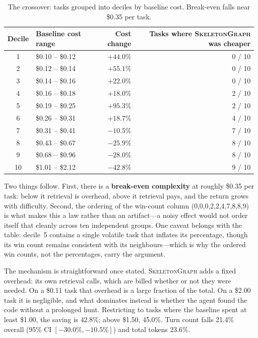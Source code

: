 \documentclass[11pt,letterpaper]{article}
\newcommand{\sg}{\textsc{SkeletonGraph}}
\begin{document}
\begin{table}[t]
\centering
\begin{tabular}{clrr}
\toprule
Decile & Baseline cost range & Cost change & Tasks where \sg{} was cheaper \\
\midrule
1  & \$0.10 -- \$0.12 & $+44.0\%$ & 0 / 10 \\
2  & \$0.12 -- \$0.14 & $+55.1\%$ & 0 / 10 \\
3  & \$0.14 -- \$0.16 & $+22.0\%$ & 0 / 10 \\
4  & \$0.16 -- \$0.18 & $+18.0\%$ & 2 / 10 \\
5  & \$0.19 -- \$0.25 & $+95.3\%$ & 2 / 10 \\
6  & \$0.26 -- \$0.31 & $+18.7\%$ & 4 / 10 \\
\midrule
7  & \$0.31 -- \$0.41 & $-10.5\%$ & 7 / 10 \\
8  & \$0.43 -- \$0.67 & $-25.9\%$ & 8 / 10 \\
9  & \$0.68 -- \$0.96 & $-28.0\%$ & 8 / 10 \\
10 & \$1.01 -- \$2.12 & $\mathbf{-42.8\%}$ & 9 / 10 \\
\bottomrule
\end{tabular}
\caption{The crossover: tasks grouped into deciles by baseline cost. Break-even
falls near \$0.35 per task.}
\label{tab:decile}
\end{table}

Two things follow. First, there is a \textbf{break-even complexity} at roughly
\$0.35 per task: below it retrieval is overhead, above it retrieval pays, and the
return grows with difficulty. Second, the ordering of the win-count column
(0,0,0,2,2,4,7,8,8,9) is what makes this a law rather than an artifact---a noisy
effect would not order itself that cleanly across ten independent groups. One
caveat belongs with the table: decile~5 contains a single volatile task that
inflates its percentage, though its win count remains consistent with its
neighbours---which is why the ordered win counts, not the percentages, carry the
argument.

The mechanism is straightforward once stated. \sg{} adds a fixed overhead: its own
retrieval calls, which are billed whether or not they were needed. On a \$0.11
task that overhead is a large fraction of the total. On a \$2.00 task it is
negligible, and what dominates instead is whether the agent found the code without
a prolonged hunt. Restricting to tasks where the baseline spent at least \$1.00,
the saving is 42.8\%; above \$1.50, 45.0\%. Turn count falls 21.4\% overall
(95\% CI $[-30.0\%, -10.5\%]$) and total tokens 23.6\%.
\end{document}
